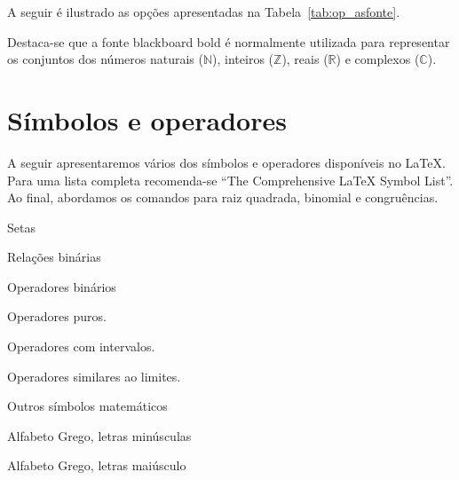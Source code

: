 A seguir é ilustrado as opções apresentadas na Tabela~\ref{tab:op_asfonte}. \\

Destaca-se que a fonte blackboard bold é normalmente utilizada para representar
os conjuntos dos números naturais ($\mathbb{N}$), inteiros ($\mathbb{Z}$), reais
($\mathbb{R}$) e complexos ($\mathbb{C}$).

\section{Símbolos e operadores}
A seguir apresentaremos vários dos símbolos e operadores disponíveis no LaTeX.
Para uma lista completa recomenda-se ``The Comprehensive LaTeX Symbol
List''\nocite{Pakin:2009:Symbol}. Ao final, abordamos os comandos para raiz
quadrada, binomial e congruências.
\begin{table}[h!tb]
  \centering
  \caption{Setas}
  \label{tab:math_arrows}
  
\end{table}
\begin{table}[!htbp]
  \caption{Relações binárias} \centering
  \label{tab:math_binary_relations}
  
\end{table}
\begin{table}[!htb]
  \centering
  \caption{Operadores binários}
  \label{tab:math_binary_operations}
  
\end{table}
\begin{table}[!htb]
  \centering
  \caption{Operadores puros.}
  \label{tab:math_functions1}
  
\end{table}
\begin{table}[!htb]
  \centering
  \caption{Operadores com intervalos.}
  \label{tab:math_functions2}
  
\end{table}
\begin{table}[!htb]
  \centering
  \caption{Operadores similares ao limites.}
  \label{tab:math_functions3}
  
\end{table}
\begin{table}[!htb]
  \centering
  \caption{Outros símbolos matemáticos}
  \label{tab:math_others}
  
\end{table}
\begin{table}[h!tb]
  \centering
  \caption{Alfabeto Grego, letras minúsculas}
  \label{tab:math_greek}
  
\end{table}
\begin{table}[!tb]
  \centering
  \caption{Alfabeto Grego, letras maiúsculo}
  \label{tab:math_greek_capital}
  
\end{table}

